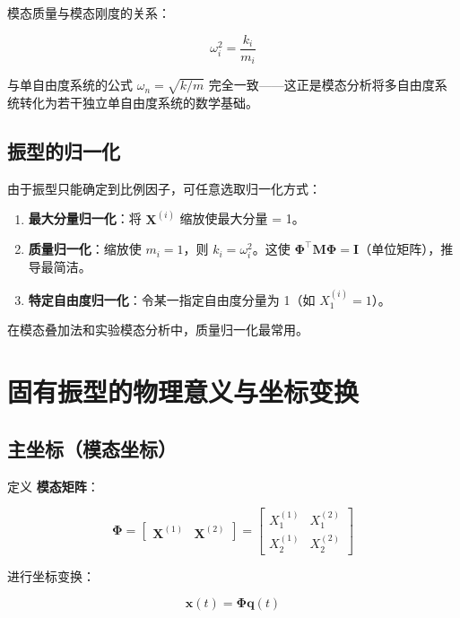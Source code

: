 模态质量与模态刚度的关系：

\begin{myformula}
\[
\omega_i^2 = \frac{k_i}{m_i}
\]
\end{myformula}

与单自由度系统的公式 $\omega_n = \sqrt{k/m}$ 完全一致——这正是模态分析将多自由度系统转化为若干独立单自由度系统的数学基础。

\subsection{振型的归一化}

由于振型只能确定到比例因子，可任意选取归一化方式：

\begin{enumerate}
\item \textbf{最大分量归一化}：将 $\mathbf{X}^{(i)}$ 缩放使最大分量 = 1。
\item \textbf{质量归一化}：缩放使 $m_i = 1$，则 $k_i = \omega_i^2$。这使 $\mathbf{\Phi}^{\top}\mathbf{M}\mathbf{\Phi} = \mathbf{I}$（单位矩阵），推导最简洁。
\item \textbf{特定自由度归一化}：令某一指定自由度分量为 1（如 $X_1^{(i)} = 1$）。
\end{enumerate}

在模态叠加法和实验模态分析中，质量归一化最常用。

\section{固有振型的物理意义与坐标变换}

\subsection{主坐标（模态坐标）}

定义 \textbf{模态矩阵}：

\[
\mathbf{\Phi} = \begin{bmatrix} \mathbf{X}^{(1)} & \mathbf{X}^{(2)} \end{bmatrix} = 
\begin{bmatrix} X_1^{(1)} & X_1^{(2)} \\ X_2^{(1)} & X_2^{(2)} \end{bmatrix}
\]

进行坐标变换：

\begin{myformula}
\[
\mathbf{x}(t) = \mathbf{\Phi} \mathbf{q}(t)
\]
\end{myformula}

